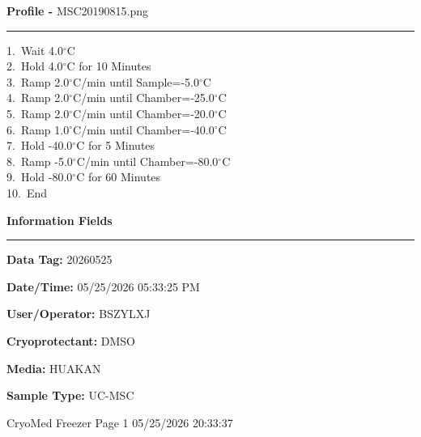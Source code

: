 \documentclass[UTF8,10pt,a4paper,fontset=fandol]{ctexart}
\newcommand{\fieldvalue}[1]{#1}
\begin{document}
\noindent
\begin{minipage}[t]{0.48\textwidth}
\textbf{Profile -}
\fieldvalue{MSC20190815.png}

\smallskip
\hrule
\smallskip

1.\ Wait 4.0$^\circ$C\\
2.\ Hold 4.0$^\circ$C for 10 Minutes\\
3.\ Ramp 2.0$^\circ$C/min until Sample=-5.0$^\circ$C\\
4.\ Ramp 2.0$^\circ$C/min until Chamber=-25.0$^\circ$C\\
5.\ Ramp 2.0$^\circ$C/min until Chamber=-20.0$^\circ$C\\
6.\ Ramp 1.0$^\circ$C/min until Chamber=-40.0$^\circ$C\\
7.\ Hold -40.0$^\circ$C for 5 Minutes\\
8.\ Ramp -5.0$^\circ$C/min until Chamber=-80.0$^\circ$C\\
9.\ Hold -80.0$^\circ$C for 60 Minutes\\
10.\ End
\end{minipage}
\hfill
\begin{minipage}[t]{0.48\textwidth}
\textbf{Information Fields}

\smallskip
\hrule
\smallskip

\textbf{Data Tag:}
\fieldvalue{20260525}

\par\noindent
\textbf{Date/Time:}
\fieldvalue{05/25/2026 05:33:25 PM}

\par\noindent
\textbf{User/Operator:}
\fieldvalue{BSZYLXJ}

\par\noindent
\textbf{Cryoprotectant:}
\fieldvalue{DMSO}

\par\noindent
\textbf{Media:}
\fieldvalue{HUAKAN}

\par\noindent
\textbf{Sample Type:}
\fieldvalue{UC-MSC}
\end{minipage}

\vfill

\noindent
CryoMed Freezer
\hfill Page 1
\hfill 05/25/2026 20:33:37
\end{document}
